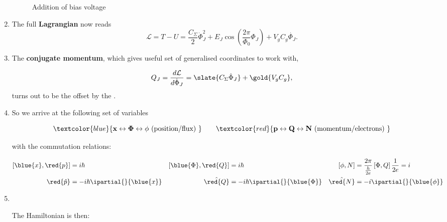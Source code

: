 \begin{enumerate}
  \begin{figure}[h]
    \centering {}
    \caption{\small             Addition             of             bias
      voltage\label{fig:cooper_pair_box_2_with_gate}}
  \end{figure}

\item The full \textbf{Lagrangian} now reads
  \begin{equation}
    \mathcal{L} = T - U = \frac{C_\Sigma}{2}\dot{\Phi}_J^2 + E_J\cos\left( \frac{2\pi}{\Phi_0}\Phi_J \right) + V_gC_g\dot{\Phi_J}.
  \end{equation}

\item  The  \textbf{conjugate  momentum},  which  gives  useful  set  of
  generalised coordinates to work with,

  \begin{equation}
    Q_J = \frac{d\mathcal{L}}{d\dot{\Phi}_J} = \slate{C_\Sigma\dot{\Phi}_J} + \gold{V_gC_g},
  \end{equation}
  \noindent turns  out to  be the     offset    by   the
  .

\item So we arrive at the following set of variables

  \begin{equation}
    { \textcolor{blue}{\mathbf{x\leftrightarrow \Phi \leftrightarrow \phi} \text{ (position/flux) }}\qquad \textcolor{red}{\mathbf{p\leftrightarrow Q \leftrightarrow N \text{ (momentum/electrons) }}}}
  \end{equation}

  \noindent with the commutation relations:

  \begin{align}
    \left[\blue{x},\red{p}\right] & =i\hbar & \left[\blue{\Phi},\red{Q}\right] & = i\hbar & \left[\phi,N\right] & = \frac{2\pi}{\frac{h}{2e}}\left[\Phi,Q\right]\frac{1}{2e} = i\\
    \red{\hat{p}} & = -i\hbar\ipartial{}{\blue{x}} & \hat{\red{Q}} & =-i\hbar\ipartial{}{\blue{\Phi}} & \hat{\red{N}} & =-i\ipartial{}{\blue{\phi}}
  \end{align}

\item\

\begin{framed}\noindent
  The Hamiltonian is then:


\end{framed}
\end{enumerate}
